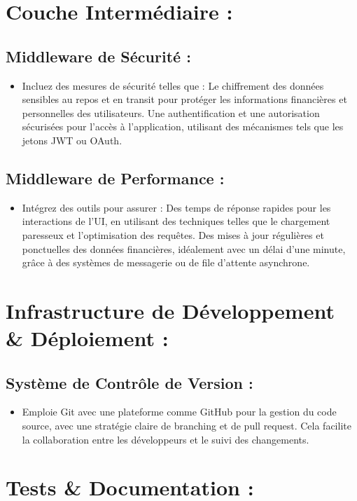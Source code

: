 \documentclass{article}
\begin{document}
\section{Couche Intermédiaire :}
\subsection{Middleware de Sécurité :}
\begin{itemize}
  \item Incluez des mesures de sécurité telles que :
  \subitem Le chiffrement des données sensibles au repos et en transit pour protéger les informations financières et personnelles des utilisateurs.
  \subitem Une authentification et une autorisation sécurisées pour l'accès à l'application, utilisant des mécanismes tels que les jetons JWT ou OAuth.
\end{itemize}
\subsection{Middleware de Performance :}
\begin{itemize}
  \item Intégrez des outils pour assurer :
  \subitem Des temps de réponse rapides pour les interactions de l'UI, en utilisant des techniques telles que le chargement paresseux et l'optimisation des requêtes.
  \subitem Des mises à jour régulières et ponctuelles des données financières, idéalement avec un délai d'une minute, grâce à des systèmes de messagerie ou de file d'attente asynchrone.
\end{itemize}

\section{Infrastructure de Développement \& Déploiement :}
\subsection{Système de Contrôle de Version : }
\begin{itemize}
  \item Emploie Git avec une plateforme comme GitHub pour la gestion du code source, avec une stratégie claire de branching et de pull request. Cela facilite la collaboration entre les développeurs et le suivi des changements.
\end{itemize}

\section{Tests \& Documentation :}
\end{document}
